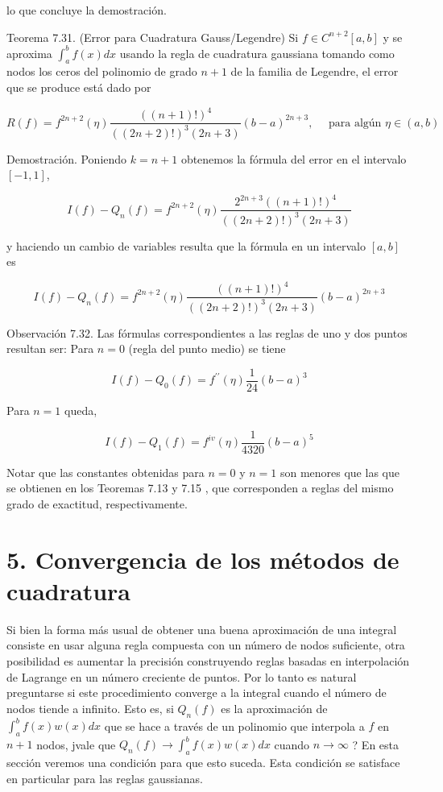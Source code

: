 \documentclass[10pt]{article}
\begin{document}
lo que concluye la demostración.

Teorema 7.31. (Error para Cuadratura Gauss/Legendre) Si $f \in C^{n+2}[a, b]$ y se aproxima $\int_{a}^{b} f(x) d x$ usando la regla de cuadratura gaussiana tomando como nodos los ceros del polinomio de grado $n+1$ de la familia de Legendre, el error que se produce está dado por


\begin{equation*}
R(f)=f^{2 n+2}(\eta) \frac{((n+1)!)^{4}}{((2 n+2)!)^{3}(2 n+3)}(b-a)^{2 n+3}, \quad \text { para algún } \eta \in(a, b) \tag{7.14}
\end{equation*}


Demostración. Poniendo $k=n+1$ obtenemos la fórmula del error en el intervalo $[-1,1]$,

$$
I(f)-Q_{n}(f)=f^{2 n+2}(\eta) \frac{2^{2 n+3}((n+1)!)^{4}}{((2 n+2)!)^{3}(2 n+3)}
$$

y haciendo un cambio de variables resulta que la fórmula en un intervalo $[a, b]$ es

$$
I(f)-Q_{n}(f)=f^{2 n+2}(\eta) \frac{((n+1)!)^{4}}{((2 n+2)!)^{3}(2 n+3)}(b-a)^{2 n+3}
$$

Observación 7.32. Las fórmulas correspondientes a las reglas de uno y dos puntos resultan ser: Para $n=0$ (regla del punto medio) se tiene

$$
I(f)-Q_{0}(f)=f^{\prime \prime}(\eta) \frac{1}{24}(b-a)^{3}
$$

Para $n=1$ queda,

$$
I(f)-Q_{1}(f)=f^{i v}(\eta) \frac{1}{4320}(b-a)^{5}
$$

Notar que las constantes obtenidas para $n=0$ y $n=1$ son menores que las que se obtienen en los Teoremas 7.13 y 7.15 , que corresponden a reglas del mismo grado de exactitud, respectivamente.

\section*{5. Convergencia de los métodos de cuadratura}
Si bien la forma más usual de obtener una buena aproximación de una integral consiste en usar alguna regla compuesta con un número de nodos suficiente, otra posibilidad es aumentar la precisión construyendo reglas basadas en interpolación de Lagrange en un número creciente de puntos. Por lo tanto es natural preguntarse si este procedimiento converge a la integral cuando el número de nodos tiende a infinito. Esto es, si $Q_{n}(f)$ es la aproximación de $\int_{a}^{b} f(x) w(x) d x$ que se hace a través de un polinomio que interpola a $f$ en $n+1$ nodos, jvale que $Q_{n}(f) \rightarrow \int_{a}^{b} f(x) w(x) d x$ cuando $n \rightarrow \infty$ ? En esta sección veremos una condición para que esto suceda. Esta condición se satisface en particular para las reglas gaussianas.
\end{document}
